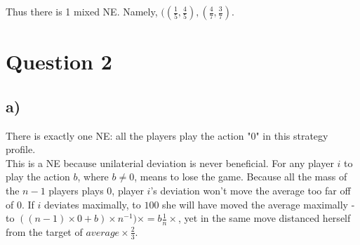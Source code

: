 \documentclass[10pt,a4paper]{article}
\begin{document}
Thus there is 1 mixed NE. Namely, $((\tfrac{1}{5},\tfrac{4}{5}),(\tfrac{4}{7},\tfrac{3}{7})$.
\section*{Question 2}
\subsection*{a)}
There is exactly one NE: all the players play the action "0" in this strategy profile.\\
This is a NE because unilaterial deviation is never beneficial. For any player $i$ to play the action $b$, where $b\neq 0$, means to lose the game. Because all the mass of the $n-1$ players plays $0$, player $i$'s deviation won't move the average too far off of $0$. If $i$ deviates maximally, to $100$ she will have moved the average maximally - to $((n-1)\times 0 + b)\times n^{-1})\times=b \tfrac{1}{n}\times$, yet in the same move distanced herself from the target of $average \times \tfrac{2}{3}$.
\end{document}
